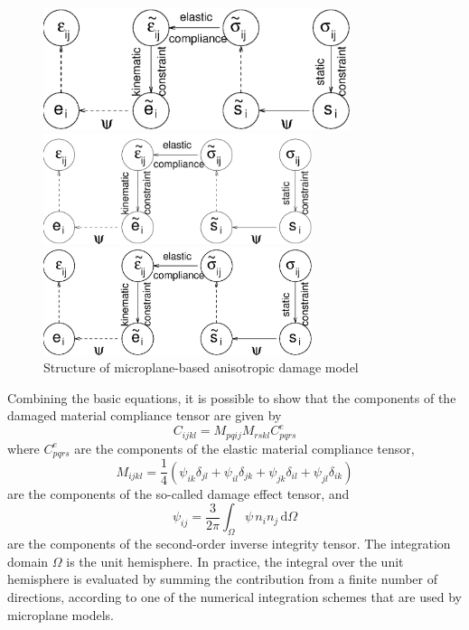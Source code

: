 \documentclass[a4paper]{article}
\newcommand{\dO}{\,\mbox{d}\Omega}
\newcommand{\quarter}{\mbox{$\frac{1}{4}$}}
\begin{document}
\begin{figure}[!htb]
\begin{htmlonly}
  \centerline{\includegraphics[width=0.8\textwidth]{dm_comp.eps}}
\end{htmlonly}
\ifpdf
 \centerline{\includegraphics[width=0.7\textwidth]{dm_comp.pdf}}
\else
 \centerline{\includegraphics[width=0.7\textwidth]{dm_comp.eps}}
\fi
\caption{Structure of microplane-based anisotropic damage model}
\label{ff4}
\end{figure}

Combining the basic equations, it is possible to show that the
components of the damaged
material compliance tensor are given by
\begin{equation}
\label{damcom}
C_{ijkl}=M_{pqij}M_{rskl}C^e_{pqrs}
\end{equation}
where $C^e_{pqrs}$ are the components of the elastic material compliance tensor,
\begin{equation}
\label{ee27}
M_{ijkl} = \quarter\left(
\psi_{ik}\delta_{jl}+\psi_{il}\delta_{jk}+\psi_{jk}\delta_{il}+\psi_{jl}\delta_{ik}\right)
\end{equation}
are the components of the so-called damage effect tensor, and
\begin{equation}
\label{ee24}
\psi_{ij} = \frac{3}{2\pi}\int_\Omega \psi\, n_i n_j \dO
\end{equation}
are the components of the second-order inverse integrity tensor.
The integration domain $\Omega$ is the unit hemisphere.
In practice, the integral over the unit hemisphere is evaluated by
summing the contribution from a finite number of directions, according
to one of the numerical integration schemes that are used by microplane
models.
\end{document}
